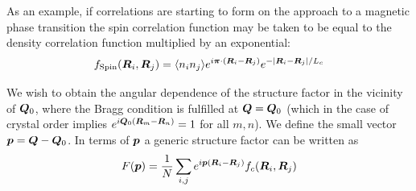 

As an example, if correlations are starting to form on the approach to a
magnetic phase transition the spin correlation function may be taken to be
equal to the density correlation function multiplied by an exponential: 
\begin{equation}
 f_{\text{Spin}}( \bm{R}_{i},\bm{R}_{j} ) =  \langle n_{i} n_{j} \rangle
  e^{i\bm{\pi} \cdot (\bm{R}_{i} - \bm{R}_{j}) }     
     e^{-|\bm{R}_{i} - \bm{R}_{j}| / L_{c} } 
\label{eq:spin-corr-fun}
\end{equation}


We wish to obtain the angular dependence of the structure factor in the
vicinity of $\bm{Q}_{0}$,  where the Bragg condition is fulfilled at
$\bm{Q}=\bm{Q}_{0}$ (which in the case of crystal order implies
$e^{i\bm{Q}_{0}(\bm{R}_{m}-\bm{R}_{n})}=1$ for all $m,n$).  We define the small
vector $\bm{p} = \bm{Q}-\bm{Q}_{0}$.  In terms of $\bm{p}$ a generic structure
factor can be written as
\begin{equation}
\begin{split} 
F(\bm{p})  & = 
   \frac{1}{N}
   \sum_{i,j}
      e^{ i \bm{p}( \bm{R}_{i} - \bm{R}_{j} ) } 
   f_{c}( \bm{R}_{i},\bm{R}_{j} )  \\ 
\end{split}
\end{equation}

